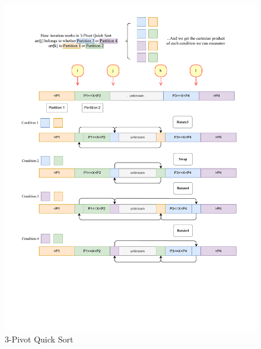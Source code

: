 \documentclass{article}
\begin{document}
\begin{figure}[H]
    \hypertarget{fig:3pivot}{}
    \caption{3-Pivot Quick Sort}
    \centering
    \hspace*{-0.25\textwidth}
    \includegraphics[width=1.5\textwidth]{3pivot.drawio.pdf}
\end{figure}
\end{document}
